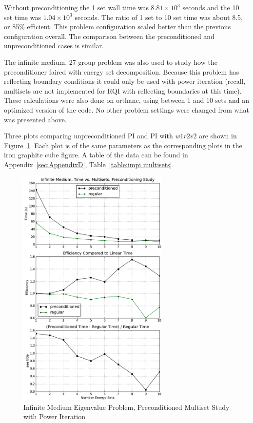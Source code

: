 Without preconditioning the 1 set wall time was $8.81 \times 10^{3}$ seconds and the 10 set time was $1.04 \times 10^{3}$ seconds. The ratio of 1 set to 10 set time was about 8.5, or 85\% efficient. This problem configuration scaled better than the previous configuration overall. The comparison between the preconditioned and unpreconditioned cases is similar. 

The infinite medium, 27 group problem was also used to study how the preconditioner faired with energy set decomposition. Because this problem has reflecting boundary conditions it could only be used with power iteration (recall, multisets are not implemented for RQI with reflecting boundaries at this time). These calculations were also done on orthanc, using between 1 and 10 sets and an optimized version of the code. No other problem settings were changed from what was presented above. 

Three plots comparing unpreconditioned PI and PI with $w1r2v2$ are shown in Figure~\ref{fig:impi multisets}. Each plot is of the same parameters as the corresponding plots in the iron graphite cube figure. A table of the data can be found in Appendix~\ref{sec:AppendixD}, Table~\ref{table:impi multisets}.
%
\begin{figure}[!ht]
    \begin{center}
      \includegraphics [width=0.67\textwidth, height=0.85\textheight] {impimultisets}
   \end{center}
   \caption{Infinite Medium Eigenvalue Problem, Preconditioned Multiset Study with Power Iteration}
   \label{fig:impi multisets}
\end{figure}

